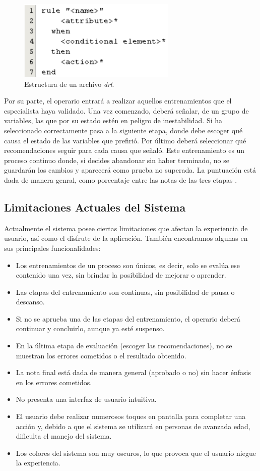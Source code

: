 \begin{figure}[h]
\centering
 \includegraphics[width=0.5\linewidth]{imagen/EstructuraDRL.png}
 \caption{Estructura de un archivo \textsl{drl}.}
 \label{fig:drools} 
\end{figure}

Por su parte, el operario entrará a realizar aquellos entrenamientos que el especialista haya validado. Una vez comenzado, deberá señalar, de un grupo de variables, las que por su estado estén en peligro de inestabilidad. Si ha seleccionado correctamente pasa a la siguiente etapa, donde debe escoger qué causa el estado de las variables que prefirió. Por último deberá seleccionar qué recomendaciones seguir para cada causa que señaló. Este entrenamiento es un proceso continuo donde, si decides abandonar sin haber terminado, no se guardarán los cambios y aparecerá como prueba no superada. La puntuación está dada de manera genral, como porcentaje entre las notas de las tres etapas \cite{elena}.

\subsection{Limitaciones Actuales del Sistema}
Actualmente el sistema posee ciertas limitaciones que afectan la experiencia de usuario, así como el disfrute de la aplicación. También encontramos algunas en sus principales funcionalidades:

\begin{itemize}
\item Los entrenamientos de un proceso son únicos, es decir, solo se evalúa ese contenido una vez, sin brindar la posibilidad de mejorar o aprender.
\item Las etapas del entrenamiento son continuas, sin posibilidad de pausa o descanso.
\item Si no se aprueba una de las etapas del entrenamiento, el operario deberá continuar y concluirlo, aunque ya esté suspenso.
\item En la última etapa de evaluación (escoger las recomendaciones), no se muestran los errores cometidos o el resultado obtenido.
\item La nota final está dada de manera general (aprobado o no) sin hacer énfasis en los errores cometidos.
\item No presenta una interfaz de usuario intuitiva.
\item El usuario debe realizar numerosos toques en pantalla para completar una acción y, debido a que el sistema se utilizará en personas de avanzada edad, dificulta el manejo del sistema.
\item Los colores del sistema son muy oscuros, lo que provoca que el usuario niegue la experiencia.
\end{itemize}


